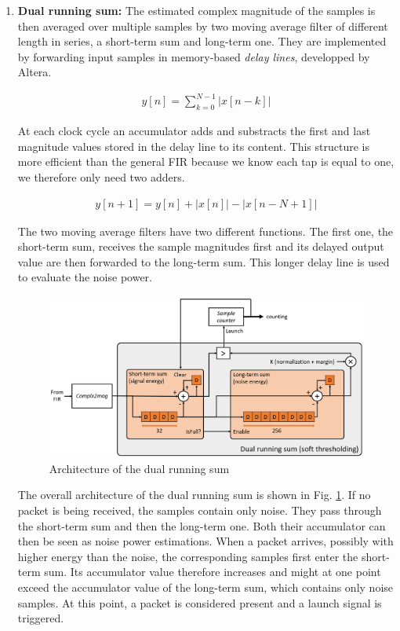 \begin{enumerate}
    \item \textbf{Dual running sum: } The estimated complex magnitude of the samples is then averaged over multiple samples by two moving average filter of different length in series, a short-term sum and long-term one. They are implemented by forwarding input samples in  memory-based \textit{delay lines}, developped by Altera.

    \begin{align}
            y[n] = \sum_{k=0}^{N-1}\left|x[n-k]\right|
    \end{align}

    At each clock cycle an accumulator adds and substracts the first and last magnitude values stored in the delay line to its content. This structure is more efficient than the general FIR because we know each tap is equal to one, we therefore only need two adders.

    \begin{align}
            y[n+1] = y[n] + \left|x[n]\right| - \left|x[n-N+1]\right|
    \end{align}

    The two moving average filters have two different functions. The first one, the short-term sum, receives the sample magnitudes first and its delayed output value are then forwarded to the long-term sum. This longer delay line is used to evaluate the noise power.

    \begin{figure}[h]
        \centering
        \includegraphics[width=\linewidth]{figures/dual_running_sum_block.png}
        \caption{Architecture of the dual running sum}
        \label{fig:dual_runnign_sum}
    \end{figure}

    The overall architecture of the dual running sum is shown in Fig. \ref{fig:dual_runnign_sum}. If no packet is being received, the samples contain only noise. They pass through the short-term sum and then the long-term one. Both their accumulator can then be seen as noise power estimations.  When a packet arrives, possibly with  higher energy than the noise, the corresponding samples first enter the short-term sum. Its accumulator value therefore increases and might at one point exceed the accumulator value of the long-term sum, which contains only noise samples. At this point, a packet is considered present and a launch signal is triggered.


\end{enumerate}
